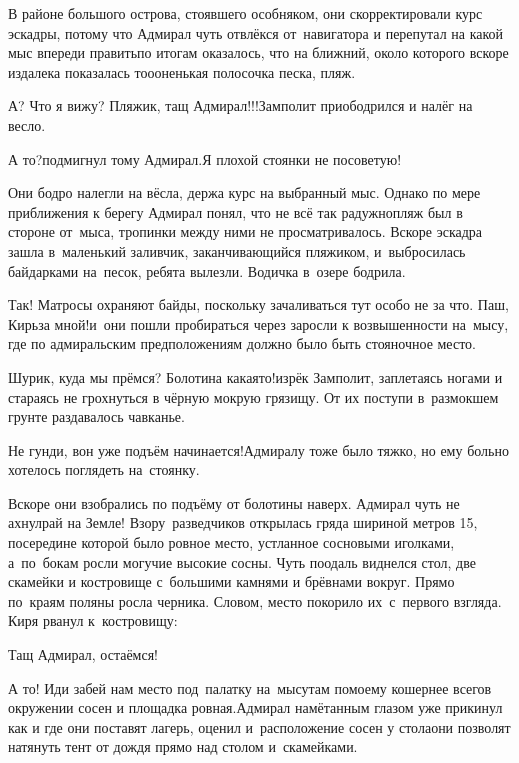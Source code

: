 В районе большого острова, стоявшего особняком, они скорректировали курс эскадры, потому что Адмирал чуть отвлёкся от~навигатора и перепутал на какой мыс впереди править\mdash по итогам оказалось, что на ближний, около которого вскоре издалека показалась то\sdash о\sdash оненькая полосочка песка, пляж.

\diagdash А? Что я вижу? Пляжик, тащ Адмирал!!!\mdash Замполит приободрился и налёг на весло.

\diagdash А то?\mdash подмигнул тому Адмирал.\mdash Я плохой стоянки не посоветую!

Они бодро налегли на вёсла, держа курс на выбранный мыс. Однако по мере приближения к берегу Адмирал понял, что не всё так радужно\mdash пляж был в стороне от~мыса, тропинки между ними не просматривалось. Вскоре эскадра зашла в~маленький заливчик, заканчивающийся пляжиком, и~выбросилась байдарками на~песок, ребята вылезли. Водичка в~озере бодрила.

\diagdash Так! Матросы охраняют байды, поскольку зачаливаться тут особо не за что. Паш, Кирь\mdash за мной!\mdash и~они пошли пробираться через заросли к возвышенности на~мысу, где по адмиральским предположениям должно было быть стояночное место.

\diagdash Шурик, куда мы прёмся? Болотина какая\sdash то!\mdash изрёк Замполит, заплетаясь ногами и стараясь не грохнуться в чёрную мокрую грязищу. От их поступи в~размокшем грунте раздавалось чавканье.

\diagdash Не гунди, вон уже подъём начинается!\mdash Адмиралу тоже было тяжко, но ему больно хотелось поглядеть на~стоянку. 

Вскоре они взобрались по подъёму от болотины наверх. Адмирал чуть не ахнул\mdash рай на Земле! Взору~разведчиков открылась гряда шириной метров 15, посередине которой было ровное место, устланное сосновыми иголками, а~по~бокам росли могучие высокие сосны. Чуть поодаль виднелся стол, две скамейки и костровище с~большими камнями и брёвнами вокруг. Прямо по~краям поляны росла черника. Словом, место покорило их~с~первого взгляда. Киря рванул к~костровищу:

\diagdash Тащ Адмирал, остаёмся!

\diagdash А то! Иди забей нам место под~палатку на~мысу\mdash там по\sdash моему кошернее всего\mdash в окружении сосен и площадка ровная.\mdash Адмирал намётанным глазом уже прикинул как и где они поставят лагерь, оценил и~расположение сосен у стола\mdash они позволят натянуть тент от дождя прямо над столом и~скамейками. 

